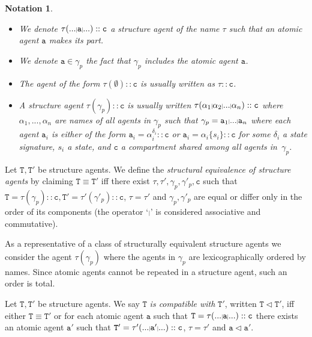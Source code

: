 \documentclass{entcs}
\renewcommand{\~}[0]{\texttildelow}
\newcommand{\pipe}{{}{\scalebox{.6}{$|$}}{}}
\newtheorem{notation}[thm]{Notation}
\begin{document}
\begin{notation}
~
\begin{itemize}
\item We denote $\tau(...\pipe\mathtt{a}\pipe...)::\mathtt{c}$ a structure agent of the name $\tau$ such that an atomic agent $\mathtt{a}$ makes its part.
\item We denote $\mathtt{a}\in\gamma_p$ the fact that $\gamma_p$ includes the atomic agent $\mathtt{a}$.
\item The agent of the form $\tau(\emptyset)::\mathtt{c}$ is usually written as $\tau::\mathtt{c}$.
\item A structure agent $\tau(\gamma_p)::\mathtt{c}$ is usually written $\tau(\alpha_1\pipe\alpha_2\pipe...\pipe\alpha_n)::\mathtt{c}$ where $\alpha_1,...,\alpha_n$ are names of all agents in $\gamma_p$ such that $\gamma_p=\mathtt{a}_1\pipe...\pipe\mathtt{a}_n$ where each agent $\mathtt{a}_i$ is either of the form $\mathtt{a}_i=\alpha_i^{\delta_i}::\mathtt{c}$ or $\mathtt{a}_i=\alpha_i\{s_i\}::\mathtt{c}$ for some $\delta_i$ a state signature, $s_i$ a state, and $\mathtt{c}$ a compartment shared among all agents in~$\gamma_p$.     
\end{itemize}
\end{notation}

\begin{defn}
Let $\mathtt{T},\mathtt{T}'$ be structure agents. We define the \emph{structural equivalence of structure agents} by claiming $\mathtt{T}\equiv\mathtt{T}'$ iff there exist $\tau,\tau',\gamma_p,\gamma'_p,\mathtt{c}$ such that $\mathtt{T}=\tau(\gamma_p)::\mathtt{c},\mathtt{T}'=\tau'(\gamma'_p)::\mathtt{c}$, $\tau=\tau'$ and $\gamma_p,\gamma'_p$ are equal or differ only in the order of its components (the operator `$\pipe$' is considered associative and commutative).
\end{defn}

As a representative of a class of structurally equivalent structure agents we consider the agent $\mathtt{\tau}(\gamma_p)$ where the agents in $\gamma_p$ are lexicographically ordered by names. Since atomic agents cannot be repeated in a structure agent, such an order is total.

\begin{defn}
Let $\mathtt{T},\mathtt{T}'$ be structure agents. We say $\mathtt{T}$ \emph{is compatible with} $\mathtt{T}'$, written $\mathtt{T} \lhd \mathtt{T}'$, iff either $\mathtt{T}\equiv\mathtt{T}'$ or for each atomic agent $\mathtt{a}$ such that $\mathtt{T}=\tau(...\pipe\mathtt{a}\pipe...)::\mathtt{c}$ there exists an atomic agent $\mathtt{a}'$ such that $\mathtt{T}'=\tau'(...\pipe\mathtt{a}'\pipe...)::\mathtt{c}$, $\tau = \tau'$ and $\mathtt{a} \lhd \mathtt{a}'$. 
\end{defn}
\end{document}
